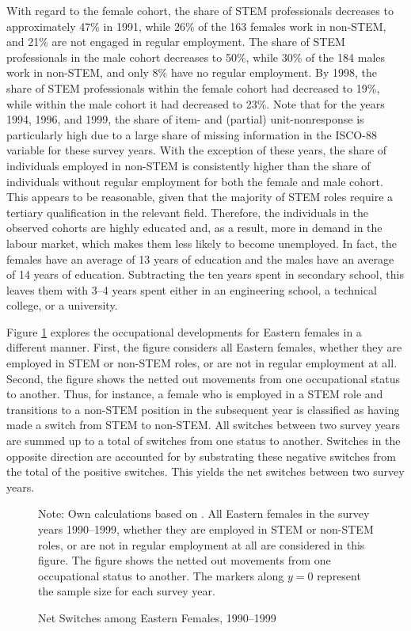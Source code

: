 \documentclass[a4paper, oneside, hyperfootnotes = false]{article}
\begin{document}
{With regard to the female cohort, the share of STEM professionals decreases to approximately 47\% in 1991, while 26\% of the 163 females work in non-STEM, and 21\% are not engaged in regular employment.
The share of STEM professionals in the male cohort decreases to 50\%, while 30\% of the 184 males work in non-STEM, and only 8\% have no regular employment.
By 1998, the share of STEM professionals within the female cohort had decreased to 19\%, while within the male cohort it had decreased to 23\%.
Note that for the years 1994, 1996, and 1999, the share of item- and (partial) unit-nonresponse is particularly high due to a large share of missing information in the ISCO-88 variable for these survey years.
With the exception of these years, the share of individuals employed in non-STEM is consistently higher than the share of individuals without regular employment for both the female and male cohort.
This appears to be reasonable, given that the majority of STEM roles require a tertiary qualification in the relevant field.
Therefore, the individuals in the observed cohorts are highly educated and, as a result, more in demand in the labour market, which makes them less likely to become unemployed.
In fact, the females have an average of 13 years of education and the males have an average of 14 years of education.
Subtracting the ten years spent in secondary school, this leaves them with 3--4 years spent either in an engineering school, a technical college, or a university.

Figure \ref{fig:netswitches} explores the occupational developments for Eastern females in a different manner.
First, the figure considers all Eastern females, whether they are employed in STEM or non-STEM roles, or are not in regular employment at all.
Second, the figure shows the netted out movements from one occupational status to another.
Thus, for instance, a female who is employed in a STEM role and transitions to a non-STEM position in the subsequent year is classified as having made a switch from STEM to non-STEM.
All switches between two survey years are summed up to a total of switches from one status to another.
Switches in the opposite direction are accounted for by substrating these negative switches from the total of the positive switches.
This yields the net switches between two survey years.

\begin{figure}[ht]
	\centering
	\caption{Net Switches among Eastern Females, 1990--1999}
	\label{fig:netswitches}
	\fontsize{9pt}{11pt}\selectfont
	\def\svgwidth{.9\textwidth}
	
	\vspace{2mm}
	\parbox{10cm}{
		\linespread{1}\footnotesize Note: Own calculations based on \cite{SOEP2023}. All Eastern females in the survey years 1990--1999, whether they are employed in STEM or non-STEM roles, or are not in regular employment at all are considered in this figure. The figure shows the netted out movements from one occupational status to another. The markers along $y = 0$ represent the sample size for each survey year.}
\end{figure}

}
\end{document}
